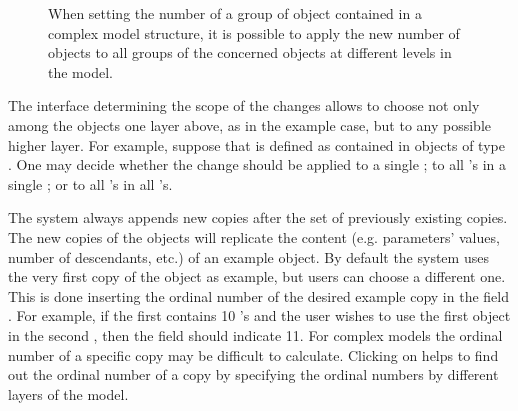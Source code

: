\documentclass [11pt,a4paper] {book}
\begin{document}
\begin{figure}[ht]
  \centering
  \caption{\small When setting the number of a group of object contained in a complex model structure, it is possible to apply the new number of objects to all groups of the concerned objects at different levels in the model.}
  \label{fig:objnum1}
\end{figure}

The interface determining the scope of the changes allows to choose not only among the objects one layer above, as in the example case, but to any possible higher layer. For example, suppose that  is defined as contained in objects of type . One may decide whether the change should be applied to a single ; to all 's in a single ; or to all 's in all 's. 

The system always appends new copies after the set of previously existing copies. The new copies of the objects  will replicate the content (e.g. parameters' values, number of descendants, etc.) of an example object. By default the system uses the very first copy of the object as example, but users can choose a different one. This is done inserting the ordinal number of the desired example copy in the field . For example, if the first  contains 10 's and the user wishes to use the first object in the second , then the field should indicate 11. For complex models the ordinal number of a specific copy may be difficult to calculate. Clicking on  helps to find out the ordinal number of a copy by specifying the ordinal numbers by different layers of the model.
\end{document}
